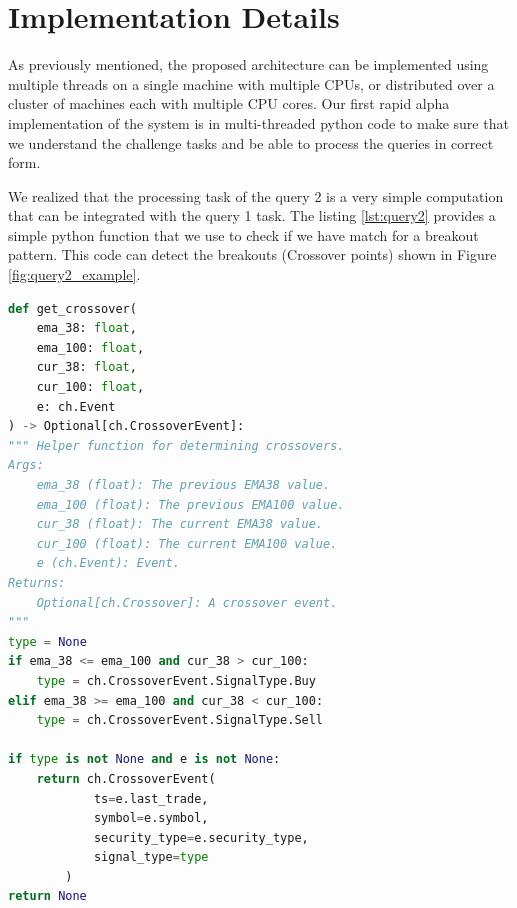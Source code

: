 


\section{Implementation Details}\label{sec:implementation}
As previously mentioned, the proposed architecture can be implemented using multiple threads on a single machine with multiple CPUs, or distributed over a 
cluster of machines each with multiple CPU cores. Our first rapid alpha implementation of the system is in multi-threaded python code to make sure
that we understand the challenge tasks and be able to process the queries in correct form.  


We realized that the processing task of the query 2 is a very simple computation that can be integrated with the query 1 task. 
The listing \ref{lst:query2} provides a simple python function that we use to check if we have match for a breakout pattern. 
This code can detect the breakouts (Crossover points) shown in Figure \ref{fig:query2_example}.




\begin{minipage}{0.9\linewidth}
\begin{lstlisting}[caption={The computation for Query 2 - Breakout Patterns of EMA38 and EMA100}, label={lst:query2},language=Python]
def get_crossover(
    ema_38: float,
    ema_100: float,
    cur_38: float,
    cur_100: float,
    e: ch.Event
) -> Optional[ch.CrossoverEvent]:
""" Helper function for determining crossovers.
Args:
    ema_38 (float): The previous EMA38 value.
    ema_100 (float): The previous EMA100 value.
    cur_38 (float): The current EMA38 value.
    cur_100 (float): The current EMA100 value.
    e (ch.Event): Event.
Returns:
    Optional[ch.Crossover]: A crossover event.
"""
type = None
if ema_38 <= ema_100 and cur_38 > cur_100:
    type = ch.CrossoverEvent.SignalType.Buy
elif ema_38 >= ema_100 and cur_38 < cur_100:
    type = ch.CrossoverEvent.SignalType.Sell

if type is not None and e is not None:
    return ch.CrossoverEvent(
            ts=e.last_trade,
            symbol=e.symbol,
            security_type=e.security_type,
            signal_type=type
        )    
return None
\end{lstlisting}
\end{minipage}





